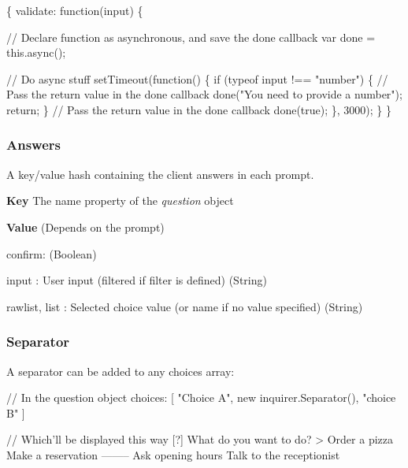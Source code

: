 \begin{DoxyCode}
\{
  validate: function(input) \{

    // Declare function as asynchronous, and save the done callback
    var done = this.async();

    // Do async stuff
    setTimeout(function() \{
      if (typeof input !== "number") \{
        // Pass the return value in the done callback
        done("You need to provide a number");
        return;
      \}
      // Pass the return value in the done callback
      done(true);
    \}, 3000);
  \}
\}
\end{DoxyCode}


\subsubsection*{Answers}

A key/value hash containing the client answers in each prompt.


\begin{DoxyItemize}
\item {\bfseries Key} The {\ttfamily name} property of the {\itshape question} object
\item {\bfseries Value} (Depends on the prompt)
\begin{DoxyItemize}
\item {\ttfamily confirm}\+: (Boolean)
\item {\ttfamily input} \+: User input (filtered if {\ttfamily filter} is defined) (String)
\item {\ttfamily rawlist}, {\ttfamily list} \+: Selected choice value (or name if no value specified) (String)
\end{DoxyItemize}
\end{DoxyItemize}

\subsubsection*{Separator}

A separator can be added to any {\ttfamily choices} array\+:


\begin{DoxyCode}
// In the question object
choices: [ "Choice A", new inquirer.Separator(), "choice B" ]

// Which'll be displayed this way
[?] What do you want to do?
 > Order a pizza
   Make a reservation
   --------
   Ask opening hours
   Talk to the receptionist
\end{DoxyCode}


